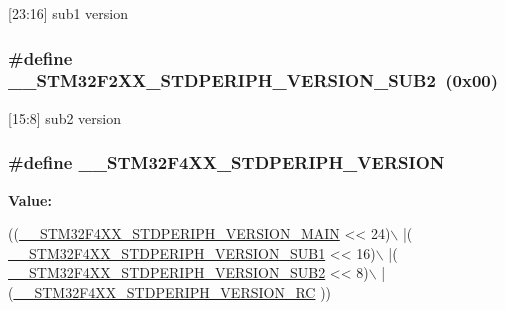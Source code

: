 \mbox{[}23\-:16\mbox{]} sub1 version \hypertarget{group___library__configuration__section_gaefad6115d1d1c9b6444fe5130fa70aa3}{
\subsubsection[{\-\_\-\-\_\-\-S\-T\-M32\-F2\-X\-X\-\_\-\-S\-T\-D\-P\-E\-R\-I\-P\-H\-\_\-\-V\-E\-R\-S\-I\-O\-N\-\_\-\-S\-U\-B2}]{\setlength{\rightskip}{0pt plus 5cm}\#define \-\_\-\-\_\-\-S\-T\-M32\-F2\-X\-X\-\_\-\-S\-T\-D\-P\-E\-R\-I\-P\-H\-\_\-\-V\-E\-R\-S\-I\-O\-N\-\_\-\-S\-U\-B2~(0x00)}}\label{group___library__configuration__section_gaefad6115d1d1c9b6444fe5130fa70aa3}
\mbox{[}15\-:8\mbox{]} sub2 version \hypertarget{group___library__configuration__section_ga2e0157b17c803dbc58b024ec8b2942e1}{
\subsubsection[{\-\_\-\-\_\-\-S\-T\-M32\-F4\-X\-X\-\_\-\-S\-T\-D\-P\-E\-R\-I\-P\-H\-\_\-\-V\-E\-R\-S\-I\-O\-N}]{\setlength{\rightskip}{0pt plus 5cm}\#define \-\_\-\-\_\-\-S\-T\-M32\-F4\-X\-X\-\_\-\-S\-T\-D\-P\-E\-R\-I\-P\-H\-\_\-\-V\-E\-R\-S\-I\-O\-N}}\label{group___library__configuration__section_ga2e0157b17c803dbc58b024ec8b2942e1}
{\bfseries Value\-:}
\begin{DoxyCode}
((\hyperlink{group___library__configuration__section_gab16ffe03509714c63d5e530131c494f4}{\_\_STM32F4XX\_STDPERIPH\_VERSION\_MAIN} << 24)\(\backslash\)
                                             |(
      \hyperlink{group___library__configuration__section_gadce716e810a51b042298fb21b63e5366}{\_\_STM32F4XX\_STDPERIPH\_VERSION\_SUB1} << 16)\(\backslash\)
                                             |(
      \hyperlink{group___library__configuration__section_ga4b16607e43a35289dc5ebb608b1261d4}{\_\_STM32F4XX\_STDPERIPH\_VERSION\_SUB2} << 8)\(\backslash\)
                                             |(\hyperlink{group___library__configuration__section_gad5bec5e54ac96b9238a6363f2088f85c}{\_\_STM32F4XX\_STDPERIPH\_VERSION\_RC}
      ))
\end{DoxyCode}
